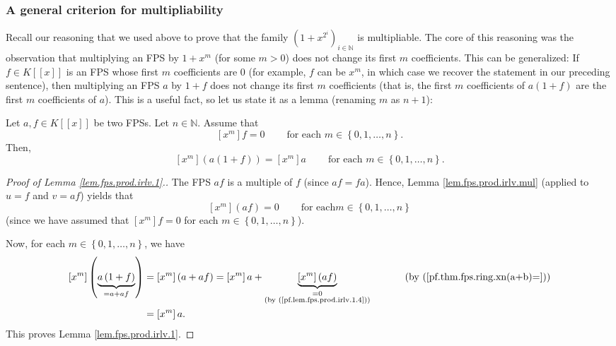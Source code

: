 \subsubsection{A general criterion for multipliability}

Recall our reasoning that we used above to prove that the family $\left(
1+x^{2^{i}}\right)  _{i\in\mathbb{N}}$ is multipliable. The core of this
reasoning was the observation that multiplying an FPS by $1+x^{m}$ (for some
$m>0$) does not change its first $m$ coefficients. This can be generalized: If
$f\in K\left[  \left[  x\right]  \right]  $ is an FPS whose first $m$
coefficients are $0$ (for example, $f$ can be $x^{m}$, in which case we
recover the statement in our preceding sentence), then multiplying an FPS $a$
by $1+f$ does not change its first $m$ coefficients (that is, the first $m$
coefficients of $a\left(  1+f\right)  $ are the first $m$ coefficients of
$a$). This is a useful fact, so let us state it as a lemma (renaming $m$ as
$n+1$):

\begin{lemma}
\label{lem.fps.prod.irlv.1}Let $a,f\in K\left[  \left[  x\right]  \right]  $
be two FPSs. Let $n\in\mathbb{N}$. Assume that
\begin{equation}
\left[  x^{m}\right]  f=0\ \ \ \ \ \ \ \ \ \ \text{for each }m\in\left\{
0,1,\ldots,n\right\}  . \label{eq.lem.fps.prod.irlv.1.ass}%
\end{equation}
Then,
\[
\left[  x^{m}\right]  \left(  a\left(  1+f\right)  \right)  =\left[
x^{m}\right]  a\ \ \ \ \ \ \ \ \ \ \text{for each }m\in\left\{  0,1,\ldots
,n\right\}  .
\]

\end{lemma}

\begin{proof}
[Proof of Lemma \ref{lem.fps.prod.irlv.1}.]The FPS $af$ is a multiple of $f$
(since $af=fa$). Hence, Lemma \ref{lem.fps.prod.irlv.mul} (applied to $u=f$
and $v=af$) yields that%
\begin{equation}
\left[  x^{m}\right]  \left(  af\right)  =0\ \ \ \ \ \ \ \ \ \ \text{for each
}m\in\left\{  0,1,\ldots,n\right\}  \label{pf.lem.fps.prod.irlv.1.4}%
\end{equation}
(since we have assumed that $\left[  x^{m}\right]  f=0$ for each $m\in\left\{
0,1,\ldots,n\right\}  $).

Now, for each $m\in\left\{  0,1,\ldots,n\right\}  $, we have
\begin{align*}
\left[  x^{m}\right]  \left(  \underbrace{a\left(  1+f\right)  }%
_{=a+af}\right)   &  =\left[  x^{m}\right]  \left(  a+af\right)  =\left[
x^{m}\right]  a+\underbrace{\left[  x^{m}\right]  \left(  af\right)
}_{\substack{=0\\\text{(by (\ref{pf.lem.fps.prod.irlv.1.4}))}}%
}\ \ \ \ \ \ \ \ \ \ \left(  \text{by (\ref{pf.thm.fps.ring.xn(a+b)=})}\right)
\\
&  =\left[  x^{m}\right]  a.
\end{align*}
This proves Lemma \ref{lem.fps.prod.irlv.1}.
\end{proof}

